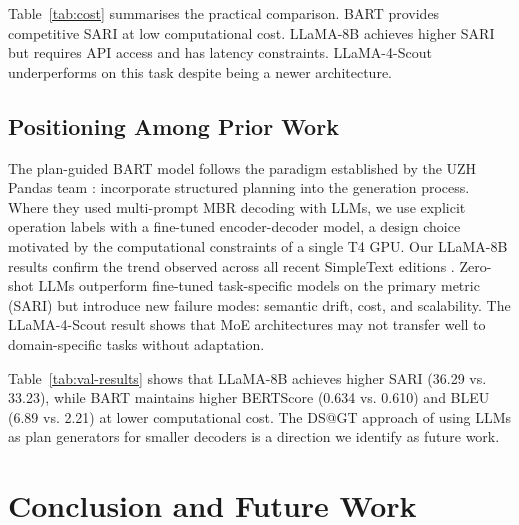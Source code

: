 \documentclass{ceurart}
\begin{document}
Table~\ref{tab:cost} summarises the practical comparison. BART provides competitive SARI at low computational cost. LLaMA-8B achieves higher SARI but requires API access and has latency constraints. LLaMA-4-Scout underperforms on this task despite being a newer architecture.

\subsection{Positioning Among Prior Work}

The plan-guided BART model follows the paradigm established by the UZH Pandas team \cite{michail2024simpletext}: incorporate structured planning into the generation process.
Where they used multi-prompt MBR decoding with LLMs, we use explicit operation labels with a fine-tuned encoder-decoder model, a design choice motivated by the computational constraints of a single T4 GPU.
Our LLaMA-8B results confirm the trend observed across all recent SimpleText editions \cite{ermakova2024simpletext, largey2024simpletext}. Zero-shot LLMs outperform fine-tuned task-specific models on the primary metric (SARI) but introduce new failure modes: semantic drift, cost, and scalability.
The LLaMA-4-Scout result shows that MoE architectures may not transfer well to domain-specific tasks without adaptation.

Table~\ref{tab:val-results} shows that LLaMA-8B achieves higher SARI (36.29 vs. 33.23), while BART maintains higher BERTScore (0.634 vs. 0.610) and BLEU (6.89 vs. 2.21) at lower computational cost.
The DS@GT approach \cite{marturi2025simpletext} of using LLMs as plan generators for smaller decoders is a direction we identify as future work.

\section{Conclusion and Future Work}
\end{document}
